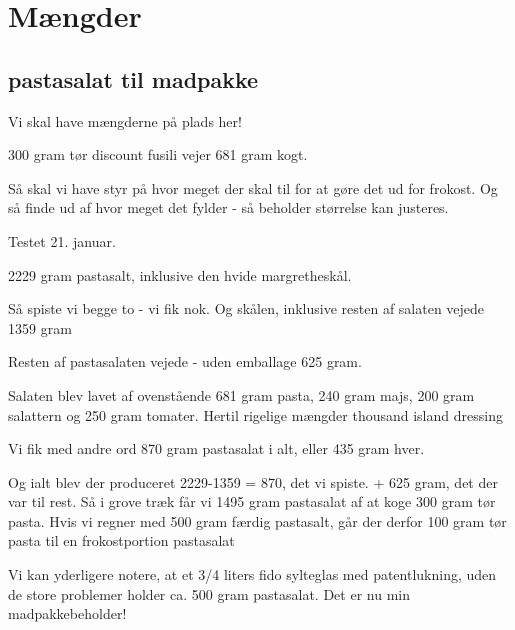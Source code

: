 \documentclass[
]{book}
\begin{document}
\hypertarget{muxe6ngder}{%
\section{Mængder}\label{muxe6ngder}}

\hypertarget{pastasalat-til-madpakke}{%
\subsection{pastasalat til madpakke}\label{pastasalat-til-madpakke}}

Vi skal have mængderne på plads her!

300 gram tør discount fusili vejer
681 gram kogt.

Så skal vi have styr på hvor meget der skal til for at gøre det ud for frokost. Og så
finde ud af hvor meget det fylder - så beholder størrelse kan justeres.

Testet 21. januar.

2229 gram pastasalt, inklusive den hvide margretheskål.

Så spiste vi begge to - vi fik nok. Og skålen, inklusive
resten af salaten vejede 1359 gram

Resten af pastasalaten vejede - uden emballage 625 gram.

Salaten blev lavet af ovenstående 681 gram pasta, 240 gram
majs, 200 gram salattern og 250 gram tomater. Hertil rigelige
mængder thousand island dressing

Vi fik med andre ord 870 gram pastasalat i alt, eller 435 gram hver.

Og ialt blev der produceret
2229-1359 = 870, det vi spiste.
+ 625 gram, det der var til rest.
Så i grove træk får vi 1495 gram pastasalat af at koge 300 gram
tør pasta. Hvis vi regner med 500 gram færdig pastasalt,
går der derfor 100 gram tør pasta til en frokostportion pastasalat

Vi kan yderligere notere, at et 3/4 liters fido sylteglas med
patentlukning, uden de store problemer holder ca. 500 gram
pastasalat. Det er nu min madpakkebeholder!
\end{document}
